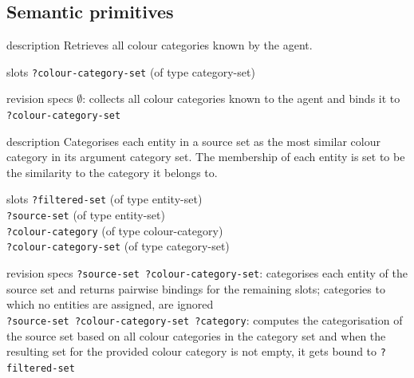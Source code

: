 \subsection{Semantic primitives}


\begin{explanation}{description}
  Retrieves all colour categories known by the agent.
\end{explanation}

\begin{explanation}{slots}
  \verb+?colour-category-set+ (of type category-set)
\end{explanation}

\begin{explanation}{revision specs}
  $\emptyset$: collects all colour categories known to the agent and
  binds it to \verb+?colour-category-set+
\end{explanation}


\begin{explanation}{description}
  Categorises each entity in a source set as the most similar colour
  category in its argument category set. The membership of each entity
  is set to be the similarity to the category it belongs to.
\end{explanation}

\begin{explanation}{slots}
  \verb+?filtered-set+ (of type entity-set) \\
  \verb+?source-set+ (of type entity-set) \\
  \verb+?colour-category+ (of type colour-category) \\
  \verb+?colour-category-set+ (of type category-set)
\end{explanation}

\begin{explanation}{revision specs}
  \verb+?source-set ?colour-category-set+: categorises each entity of
  the source set and returns pairwise bindings for the remaining
  slots; categories to which no entities are assigned, are ignored \\
  \verb+?source-set ?colour-category-set ?category+: computes the
  categorisation of the source set based on all colour categories in
  the category set and when the resulting set for the provided colour
  category is not empty, it gets bound to \verb+?filtered-set+
\end{explanation}

